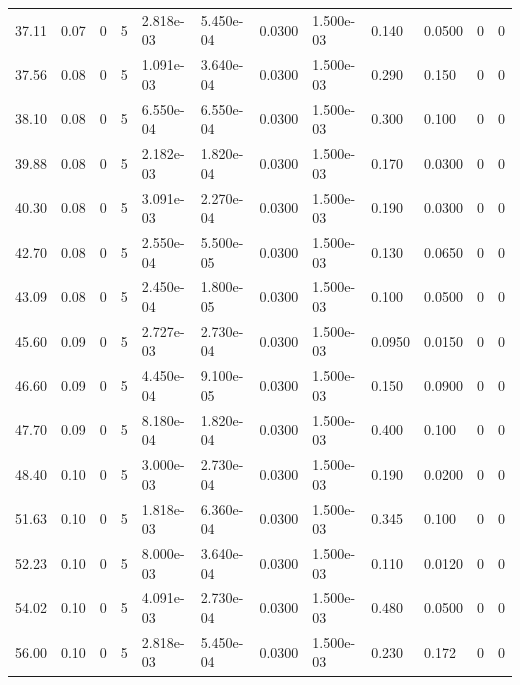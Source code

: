 \documentclass[preview]{standalone}
\begin{document}
{{\begin{tabular}{L{1.2cm}C{1.2cm} C{0.3cm}C{0.5cm} C{1.4cm}C{1.4cm} C{1.4cm}C{1.4cm} C{1.6cm}C{1.6cm} C{1.6cm}C{1.6cm}}
  37.11  &  0.07  & 0     &  5 &  2.818e-03  & 5.450e-04  &  0.0300&   1.500e-03& 0.140 & 0.0500   &  0 & 0  \\ 
  37.56  &  0.08  & 0     &  5 &  1.091e-03  & 3.640e-04  &  0.0300&   1.500e-03& 0.290 & 0.150   &  0 & 0  \\ 
  38.10  &  0.08  & 0     &  5 &  6.550e-04  & 6.550e-04  &  0.0300&   1.500e-03& 0.300 & 0.100   &  0 & 0  \\ 
  39.88  &  0.08  & 0     &  5 &  2.182e-03  & 1.820e-04  &  0.0300&   1.500e-03& 0.170 & 0.0300   &  0 & 0  \\ 
  40.30  &  0.08  & 0     &  5 &  3.091e-03  & 2.270e-04  &  0.0300&   1.500e-03& 0.190 & 0.0300   &  0 & 0  \\ 
  42.70  &  0.08  & 0     &  5 &  2.550e-04  & 5.500e-05  &  0.0300&   1.500e-03& 0.130 & 0.0650   &  0 & 0  \\ 
  43.09  &  0.08  & 0     &  5 &  2.450e-04  & 1.800e-05  &  0.0300&   1.500e-03& 0.100 & 0.0500   &  0 & 0  \\ 
  45.60  &  0.09  & 0     &  5 &  2.727e-03  & 2.730e-04  &  0.0300&   1.500e-03& 0.0950 & 0.0150   &  0 & 0  \\ 
  46.60  &  0.09  & 0     &  5 &  4.450e-04  & 9.100e-05  &  0.0300&   1.500e-03& 0.150 & 0.0900   &  0 & 0  \\ 
  47.70  &  0.09  & 0     &  5 &  8.180e-04  & 1.820e-04  &  0.0300&   1.500e-03& 0.400 & 0.100   &  0 & 0  \\ 
  48.40  &  0.10  & 0     &  5 &  3.000e-03  & 2.730e-04  &  0.0300&   1.500e-03& 0.190 & 0.0200   &  0 & 0  \\ 
  51.63  &  0.10  & 0     &  5 &  1.818e-03  & 6.360e-04  &  0.0300&   1.500e-03& 0.345 & 0.100   &  0 & 0  \\ 
  52.23  &  0.10  & 0     &  5 &  8.000e-03  & 3.640e-04  &  0.0300&   1.500e-03& 0.110 & 0.0120   &  0 & 0  \\ 
  54.02  &  0.10  & 0     &  5 &  4.091e-03  & 2.730e-04  &  0.0300&   1.500e-03& 0.480 & 0.0500   &  0 & 0  \\ 
  56.00  &  0.10  & 0     &  5 &  2.818e-03  & 5.450e-04  &  0.0300&   1.500e-03& 0.230 & 0.172   &  0 & 0  \\ 
\hline 
\end{tabular} 

}}
\end{document}
